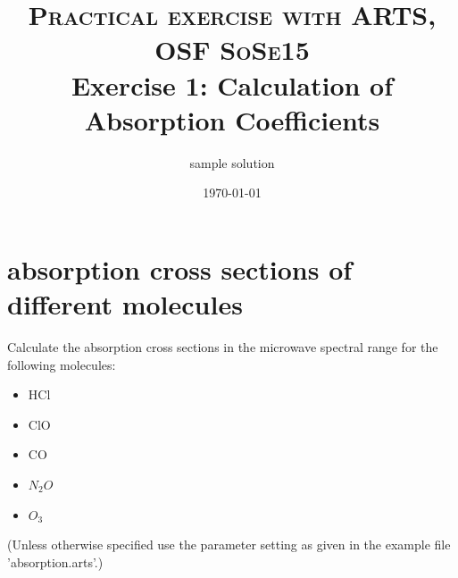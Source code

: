 \documentclass[paper=a4, fontsize=11pt]{scrartcl} %
\title{	
\normalfont \normalsize 
\textsc{Practical exercise with ARTS, OSF SoSe15} \\ [25pt] %
\huge Exercise 1: Calculation of Absorption Coefficients  \\ %
}
\author{sample solution}
\date{\normalsize\today}
\numberwithin{figure}{section}
\begin{document}
\maketitle

\section{absorption cross sections of different molecules}

Calculate the absorption cross sections in the microwave spectral range for the following molecules: 
\begin{itemize}
	\item HCl
	\item ClO
	\item CO
	\item $N_{2}O$
	\item $O_{3}$
\end{itemize}
(Unless otherwise specified use the parameter setting as given in the example file 'absorption.arts'.)	
\end{document}
